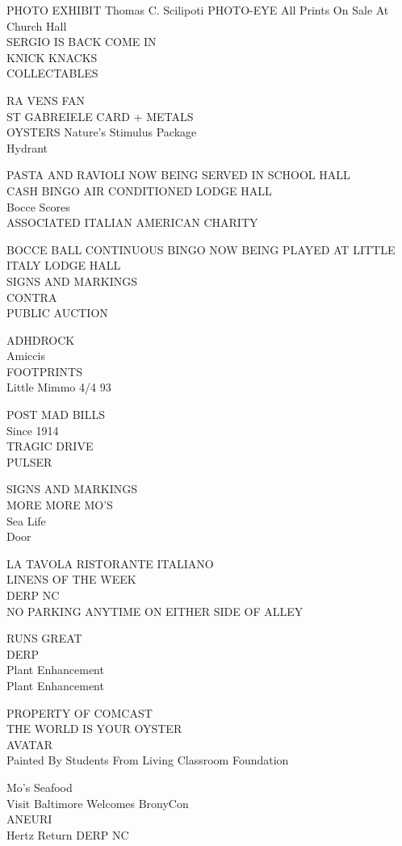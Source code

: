 \documentclass[10pt,letterpaper]{article}
\begin{document}
PHOTO EXHIBIT Thomas C. Scilipoti PHOTO{-}EYE All Prints On Sale At Church Hall\\
SERGIO IS BACK COME IN\\
KNICK KNACKS\\
COLLECTABLES

RA VENS FAN\\
ST GABREIELE CARD + METALS\\
OYSTERS Nature's Stimulus Package\\
Hydrant

PASTA AND RAVIOLI NOW BEING SERVED IN SCHOOL HALL\\
CASH BINGO AIR CONDITIONED LODGE HALL\\
Bocce Scores\\
ASSOCIATED ITALIAN AMERICAN CHARITY

BOCCE BALL CONTINUOUS BINGO NOW BEING PLAYED AT LITTLE ITALY LODGE HALL\\
SIGNS AND MARKINGS\\
CONTRA\\
PUBLIC AUCTION

ADHDROCK\\
Amiccis\\
FOOTPRINTS\\
Little Mimmo 4/4 93

POST MAD BILLS\\
Since 1914\\
TRAGIC DRIVE\\
PULSER

SIGNS AND MARKINGS\\
MORE MORE MO'S\\
Sea Life\\
Door

LA TAVOLA RISTORANTE ITALIANO\\
LINENS OF THE WEEK\\
DERP NC\\
NO PARKING ANYTIME ON EITHER SIDE OF ALLEY

RUNS GREAT\\
DERP\\
Plant Enhancement\\
Plant Enhancement

PROPERTY OF COMCAST\\
THE WORLD IS YOUR OYSTER\\
AVATAR\\
Painted By Students From Living Classroom Foundation

Mo's Seafood\\
Visit Baltimore Welcomes BronyCon\\
ANEURI\\
Hertz Return DERP NC
\end{document}
